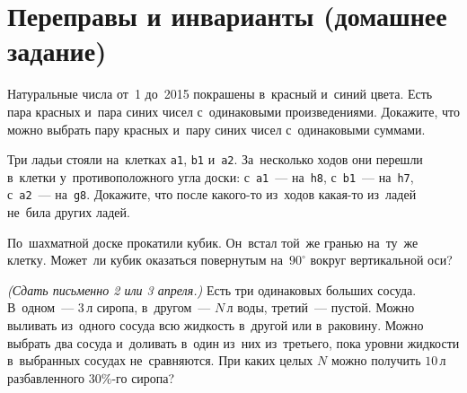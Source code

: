

\section*{Переправы и инварианты (домашнее задание)}



\begin{problems}

\item
Натуральные числа от~1 до~2015 покрашены в~красный и~синий цвета.
Есть пара красных и~пара синих чисел с~одинаковыми произведениями.
Докажите, что можно выбрать пару красных и~пару синих чисел с~одинаковыми
суммами.

Три ладьи стояли на~клетках \texttt{a1}, \texttt{b1} и~\texttt{a2}.
За~несколько ходов они перешли в~клетки у~противоположного угла доски:
с~\texttt{a1}~--- на~\texttt{h8},
с~\texttt{b1}~--- на~\texttt{h7},
с~\texttt{a2}~--- на~\texttt{g8}.
Докажите, что после какого-то из~ходов какая-то из~ладей не~била других ладей.

\item
По~шахматной доске прокатили кубик.
Он~встал той~же гранью на~ту~же клетку.
Может~ли кубик оказаться повернутым на~$90^\circ$ вокруг вертикальной оси?

\item
\emph{(Сдать письменно 2 или 3 апреля.)}
Есть три одинаковых больших сосуда.
В~одном~--- $3\,\text{л}$ сиропа, в~другом~--- $N\,\text{л}$ воды,
третий~--- пустой.
Можно выливать из~одного сосуда всю жидкость в~другой или в~раковину.
Можно выбрать два сосуда и~доливать в~один из~них из~третьего, пока уровни
жидкости в~выбранных сосудах не~сравняются.
При каких целых $N$ можно получить $10\,\text{л}$ разбавленного $30\%$-го
сиропа?

\end{problems}

